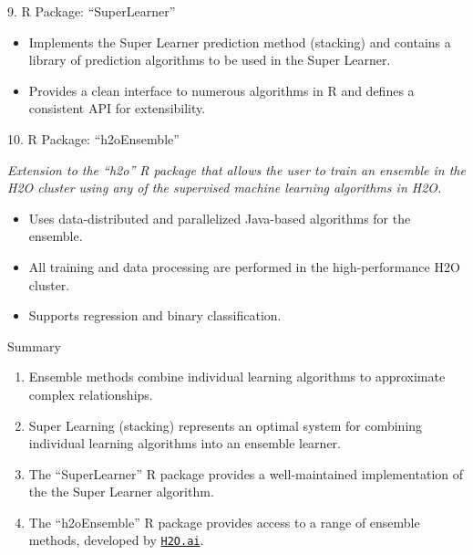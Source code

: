 \documentclass[12pt,t,handout]{beamer}
\begin{document}
\begin{frame}[c]{9. R Package: ``SuperLearner''}

\vspace*{3mm}

\centering

  \begin{itemize}
    \itemsep12pt
    \item Implements the Super Learner prediction method (stacking) and
          contains a library of prediction algorithms to be used in the Super
          Learner.
    \item Provides a clean interface to numerous algorithms in R and defines a
          consistent API for extensibility.
  \end{itemize}

\note{
}
\end{frame}


\begin{frame}{10. R Package: ``h2oEnsemble''}

\vspace*{3mm}

\centering

\textit{Extension to the ``h2o'' R package that allows the user to train an
ensemble in the H2O cluster using any of the supervised machine learning
algorithms in H2O.}

\vspace{1em}

  \begin{itemize}
    \itemsep12pt
    \item Uses data-distributed and parallelized Java-based algorithms for the
          ensemble.
    \item All training and data processing are performed in the
          high-performance H2O cluster.
    \item Supports regression and binary classification.
  \end{itemize}

\note{
}
\end{frame}


\begin{frame}[c]{Summary}

  \begin{enumerate}
  \itemsep12pt
    \item Ensemble methods combine individual learning algorithms to approximate
          complex relationships.
    \item Super Learning (stacking) represents an optimal system for combining
          individual learning algorithms into an ensemble learner.
    \item The ``SuperLearner'' R package provides a well-maintained
          implementation of the the Super Learner algorithm.
    \item The ``h2oEnsemble'' R package provides access to a range of ensemble
          methods, developed by \href{http://www.h2o.ai}{\tt H2O.ai}.
  \end{enumerate}

\end{frame}
\end{document}
